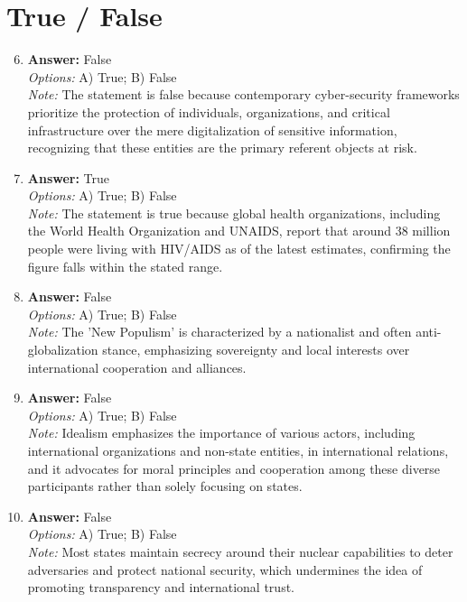 \documentclass[12pt]{article}
\begin{document}
\section*{True / False}
\begin{enumerate}[label=\arabic*.]
\setcounter{enumi}{5}
\item \textbf{Answer:} False
\\ \textit{Options:} A) True; B) False
\\ \textit{Note:} The statement is false because contemporary cyber-security frameworks prioritize the protection of individuals, organizations, and critical infrastructure over the mere digitalization of sensitive information, recognizing that these entities are the primary referent objects at risk.
\item \textbf{Answer:} True
\\ \textit{Options:} A) True; B) False
\\ \textit{Note:} The statement is true because global health organizations, including the World Health Organization and UNAIDS, report that around 38 million people were living with HIV/AIDS as of the latest estimates, confirming the figure falls within the stated range.
\item \textbf{Answer:} False
\\ \textit{Options:} A) True; B) False
\\ \textit{Note:} The 'New Populism' is characterized by a nationalist and often anti-globalization stance, emphasizing sovereignty and local interests over international cooperation and alliances.
\item \textbf{Answer:} False
\\ \textit{Options:} A) True; B) False
\\ \textit{Note:} Idealism emphasizes the importance of various actors, including international organizations and non-state entities, in international relations, and it advocates for moral principles and cooperation among these diverse participants rather than solely focusing on states.
\item \textbf{Answer:} False
\\ \textit{Options:} A) True; B) False
\\ \textit{Note:} Most states maintain secrecy around their nuclear capabilities to deter adversaries and protect national security, which undermines the idea of promoting transparency and international trust.
\end{enumerate}
\end{document}
